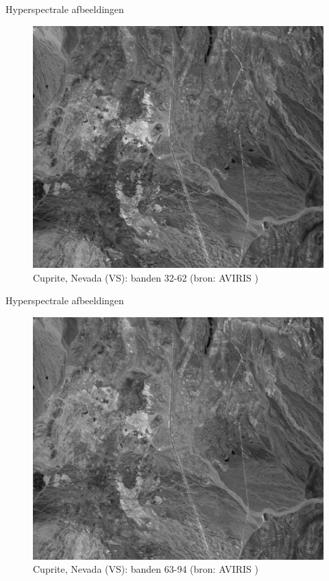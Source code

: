 \documentclass[t,12pt,dutch
\ifx\beamermode\undefined\else,\beamermode\fi
]{beamer}
\begin{document}
\begin{frame}{Hyperspectrale afbeeldingen}

\begin{figure}[H]
\centering
\includegraphics[scale=0.3]{images/cuprite_bands_32-63.png}
\caption{Cuprite, Nevada (VS): banden 32-62 (bron: AVIRIS \cite{ref:ehu_aviris_cuprite})}
\end{figure}

\end{frame}

\begin{frame}{Hyperspectrale afbeeldingen}

\begin{figure}[H]
\centering
\includegraphics[scale=0.3]{images/cuprite_bands_63-95.png}
\caption{Cuprite, Nevada (VS): banden 63-94 (bron: AVIRIS \cite{ref:ehu_aviris_cuprite})}
\end{figure}

\end{frame}
\end{document}
